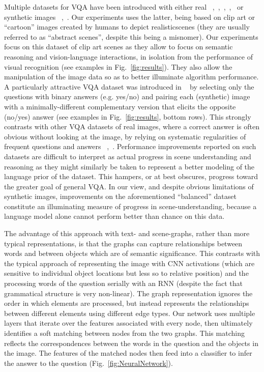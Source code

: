 \documentclass[10pt,twocolumn,letterpaper]{article}
\begin{document}
Multiple datasets for VQA have been introduced with either real ~\cite{AntolALMBZP15},~\cite{KrishnaZGJHKCKL16},~\cite{MalinowskiF14},~\cite{RenKZ15},~\cite{ZhuGBF15} or synthetic images ~\cite{AntolALMBZP15},~\cite{ZhangGSBP15}.
Our experiments uses the latter, being based on clip art
or “cartoon” images created by humans to depict realisticscenes (they are usually referred to as “abstract scenes”, despite
this being a misnomer). Our experiments focus on
this dataset of clip art scenes as they allow to focus on semantic
reasoning and vision-language interactions, in isolation
from the performance of visual recognition (see examples
in Fig.~\ref{fig:results}). They also allow the manipulation of
the image data so as to better illuminate algorithm performance.
A particularly attractive VQA dataset was introduced
in ~\cite{ZhangGSBP15} by selecting only the questions with binary answers
(e.g. yes/no) and pairing each (synthetic) image with
a minimally-different complementary version that elicits the
opposite (no/yes) answer (see examples in Fig.~\ref{fig:results}, bottom
rows). This strongly contrasts with other VQA datasets of
real images, where a correct answer is often obvious without
looking at the image, by relying on systematic regularities
of frequent questions and answers ~\cite{AntolALMBZP15},~\cite{ZhangGSBP15}. Performance
improvements reported on such datasets are difficult to interpret
as actual progress in scene understanding and reasoning
as they might similarly be taken to represent a better
modeling of the language prior of the dataset. This hampers,
or at best obscures, progress toward the greater goal
of general VQA. In our view, and despite obvious limitations
of synthetic images, improvements on the aforementioned
“balanced” dataset constitute an illuminating measure
of progress in scene-understanding, because a language model alone cannot perform better than chance on this data.\par
The advantage of this approach
with text- and scene-graphs, rather than more typical representations,
is that the graphs can capture relationships between
words and between objects which are of semantic significance. This contrasts with the typical approach of representing the
image with CNN activations (which are sensitive to individual
object locations but less so to relative position) and the
processing words of the question serially with an RNN (despite
the fact that grammatical structure is very non-linear).
The graph representation ignores the order in which elements
are processed, but instead represents the relationships
between different elements using different edge types. Our
network uses multiple layers that iterate over the features
associated with every node, then ultimately identifies a soft
matching between nodes from the two graphs. This matching
reflects the correspondences between the words in the
question and the objects in the image. The features of the
matched nodes then feed into a classifier to infer the answer
to the question (Fig.~\ref{fig:NeuralNetwork}).\par
\end{document}
